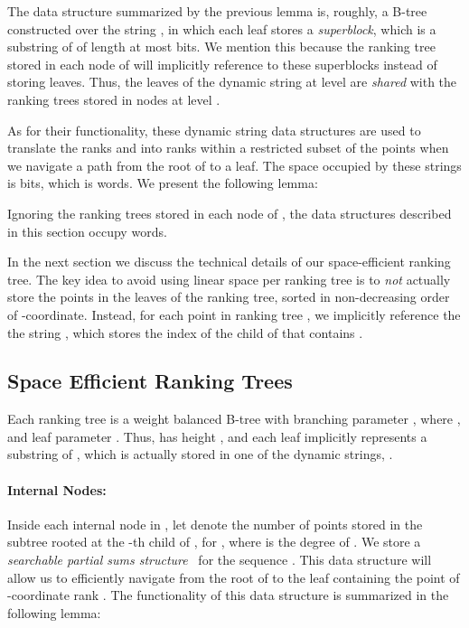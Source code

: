 \documentclass{llncs}
\begin{document}
The data structure summarized by the previous lemma is, roughly, a
B-tree constructed over the string , in which each leaf
stores a \emph{superblock}, which is a substring of  of
length at most  bits.  We mention this because the ranking tree
stored in each node of  will implicitly reference to these
superblocks instead of storing leaves.  Thus, the leaves of the
dynamic string at level  are \emph{shared} with the ranking
trees stored in nodes at level .

As for their functionality, these dynamic string data structures
 are used to translate the ranks  and  into ranks
within a restricted subset of the points when we navigate a path from
the root of  to a leaf.  The space occupied by these strings is
 bits,
which is  words.  We present the following lemma:

\begin{lemma}
\label{lem:space-1}
Ignoring the ranking trees stored in each node of , the data
structures described in this section occupy  words.
\end{lemma}

In the next section we discuss the technical details of our
space-efficient ranking tree.  The key idea to avoid using linear
space per ranking tree is to \emph{not} actually store the points in
the leaves of the ranking tree, sorted in non-decreasing order of
-coordinate.  Instead, for each point  in ranking tree ,
we implicitly reference the the string , which stores the index
of the child of  that contains .

\subsection{Space Efficient Ranking Trees\label{sec:serank}}

Each ranking tree  is a weight balanced B-tree with branching
parameter , where , and leaf parameter .  Thus,  has height , and each leaf implicitly represents a substring of
, which is actually stored in one of the dynamic strings,
.

\paragraph{Internal Nodes:}
Inside each internal node  in , let  denote the number
of points stored in the subtree rooted at the -th child of , for
, where  is the degree of .  We store a
\emph{searchable partial sums structure}~\cite{RRR02} for the sequence
.  This data structure will allow us to
efficiently navigate from the root of  to the leaf containing
the point of -coordinate rank .  The functionality of this data
structure is summarized in the following lemma:
\end{document}
